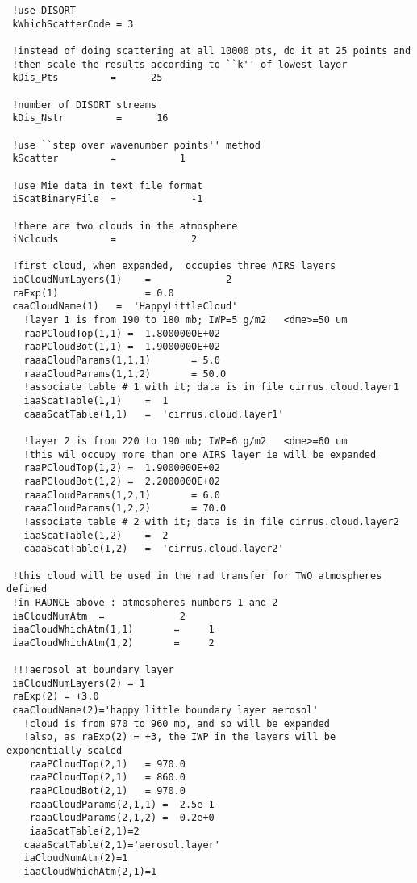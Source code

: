 \documentclass[12pt]{article}
\begin{document}
\begin{scriptsize}
\begin{verbatim}
 !use DISORT
 kWhichScatterCode = 3

 !instead of doing scattering at all 10000 pts, do it at 25 points and
 !then scale the results according to ``k'' of lowest layer
 kDis_Pts         =      25

 !number of DISORT streams
 kDis_Nstr         =      16

 !use ``step over wavenumber points'' method
 kScatter         =           1

 !use Mie data in text file format
 iScatBinaryFile  =             -1

 !there are two clouds in the atmosphere
 iNclouds         =             2

 !first cloud, when expanded,  occupies three AIRS layers
 iaCloudNumLayers(1)    =             2
 raExp(1)               = 0.0
 caaCloudName(1)   =  'HappyLittleCloud'
   !layer 1 is from 190 to 180 mb; IWP=5 g/m2   <dme>=50 um
   raaPCloudTop(1,1) =  1.8000000E+02
   raaPCloudBot(1,1) =  1.9000000E+02
   raaaCloudParams(1,1,1)       = 5.0  
   raaaCloudParams(1,1,2)       = 50.0  
   !associate table # 1 with it; data is in file cirrus.cloud.layer1
   iaaScatTable(1,1)    =  1
   caaaScatTable(1,1)   =  'cirrus.cloud.layer1'

   !layer 2 is from 220 to 190 mb; IWP=6 g/m2   <dme>=60 um
   !this wil occupy more than one AIRS layer ie will be expanded
   raaPCloudTop(1,2) =  1.9000000E+02
   raaPCloudBot(1,2) =  2.2000000E+02
   raaaCloudParams(1,2,1)       = 6.0  
   raaaCloudParams(1,2,2)       = 70.0  
   !associate table # 2 with it; data is in file cirrus.cloud.layer2
   iaaScatTable(1,2)    =  2
   caaaScatTable(1,2)   =  'cirrus.cloud.layer2'

 !this cloud will be used in the rad transfer for TWO atmospheres defined
 !in RADNCE above : atmospheres numbers 1 and 2
 iaCloudNumAtm  =             2
 iaaCloudWhichAtm(1,1)       =     1
 iaaCloudWhichAtm(1,2)       =     2

 !!!aerosol at boundary layer
 iaCloudNumLayers(2) = 1
 raExp(2) = +3.0
 caaCloudName(2)='happy little boundary layer aerosol'
   !cloud is from 970 to 960 mb, and so will be expanded
   !also, as raExp(2) = +3, the IWP in the layers will be exponentially scaled
    raaPCloudTop(2,1)   = 970.0
    raaPCloudTop(2,1)   = 860.0
    raaPCloudBot(2,1)   = 970.0
    raaaCloudParams(2,1,1) =  2.5e-1
    raaaCloudParams(2,1,2) =  0.2e+0
    iaaScatTable(2,1)=2
   caaaScatTable(2,1)='aerosol.layer' 
   iaCloudNumAtm(2)=1
   iaaCloudWhichAtm(2,1)=1


\end{verbatim}
\end{scriptsize}
\end{document}
